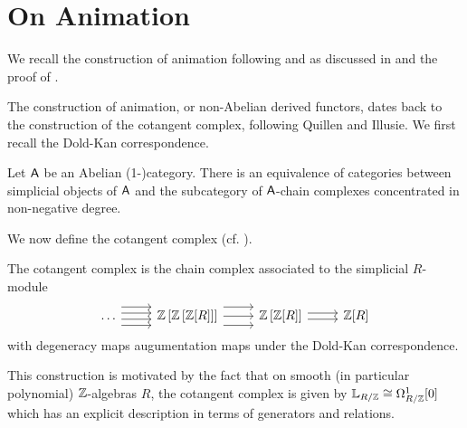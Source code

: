 \section{On Animation}\label{appdx: on animation}
We recall the construction of animation following \cite[\S 5.5.8]{HTT} and as discussed in  and the proof of .



The construction of animation, or non-Abelian derived functors, dates back to the construction of the cotangent complex, following Quillen and Illusie. We first recall the Dold-Kan correspondence. 
\begin{theorem}\label{thm: Dold-Kan}
    Let $\mathsf{A}$ be an Abelian (1-)category. There is an equivalence of categories between simplicial objects of $\mathsf{A}$ and the subcategory of $\mathsf{A}$-chain complexes concentrated in non-negative degree. 
\end{theorem}
We now define the cotangent complex (cf. \cite[\href{https://stacks.math.columbia.edu/tag/08PL}{Tag 08PL}]{stacks-project}). 
\begin{definition}\label{def: cotangent complex}
    The cotangent complex is the chain complex associated to the simplicial $R$-module 
    $$%
    \begin{tikzcd}
        \dots & {\ZZ\left[\ZZ\left[\ZZ[R]\right]\right]} & {\ZZ\left[\ZZ[R]\right]} & {\ZZ[R]}
        \arrow[shift right=3, from=1-1, to=1-2]
        \arrow[shift left=3, from=1-1, to=1-2]
        \arrow[shift right, from=1-1, to=1-2]
        \arrow[shift left, from=1-1, to=1-2]
        \arrow[from=1-2, to=1-3]
        \arrow[shift left=3, from=1-2, to=1-3]
        \arrow[shift right=3, from=1-2, to=1-3]
        \arrow[shift left, from=1-3, to=1-4]
        \arrow[shift right, from=1-3, to=1-4]
    \end{tikzcd}$$
    with degeneracy maps augumentation maps under the Dold-Kan correspondence. 
\end{definition}
This construction is motivated by the fact that on smooth (in particular polynomial) $\mathbb{Z}$-algebras $R$, the cotangent complex is given by $\mathbb{L}_{R/\mathbb{Z}}\cong\Omega^{1}_{R/\mathbb{Z}}[0]$ which has an explicit description in terms of generators and relations. 

